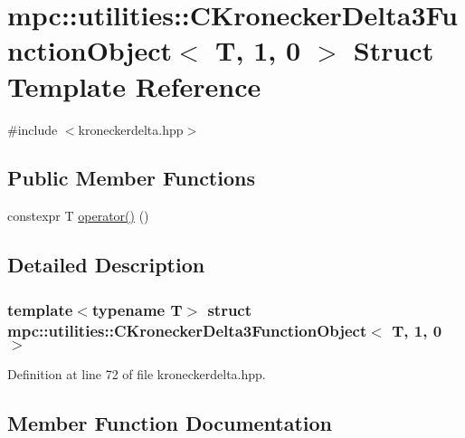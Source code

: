 \hypertarget{structmpc_1_1utilities_1_1_c_kronecker_delta3_function_object_3_01_t_00_011_00_010_01_4}{}\section{mpc\+:\+:utilities\+:\+:C\+Kronecker\+Delta3\+Function\+Object$<$ T, 1, 0 $>$ Struct Template Reference}
\label{structmpc_1_1utilities_1_1_c_kronecker_delta3_function_object_3_01_t_00_011_00_010_01_4}


{\ttfamily \#include $<$kroneckerdelta.\+hpp$>$}

\subsection*{Public Member Functions}
\begin{DoxyCompactItemize}
\item 
constexpr T \mbox{\hyperlink{structmpc_1_1utilities_1_1_c_kronecker_delta3_function_object_3_01_t_00_011_00_010_01_4_a677c23e018869f0015a684eea07a4040}{operator()}} ()
\end{DoxyCompactItemize}


\subsection{Detailed Description}
\subsubsection*{template$<$typename T$>$\newline
struct mpc\+::utilities\+::\+C\+Kronecker\+Delta3\+Function\+Object$<$ T, 1, 0 $>$}



Definition at line 72 of file kroneckerdelta.\+hpp.



\subsection{Member Function Documentation}
\mbox{\label{structmpc_1_1utilities_1_1_c_kronecker_delta3_function_object_3_01_t_00_011_00_010_01_4_a677c23e018869f0015a684eea07a4040}} 
